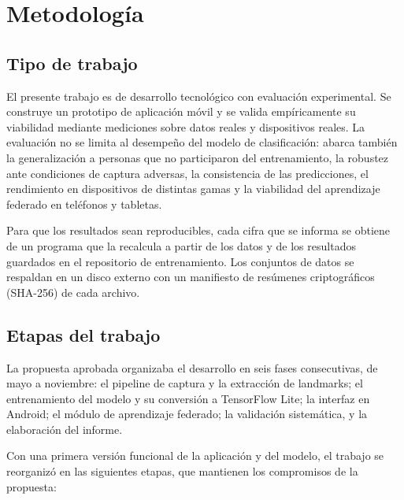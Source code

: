 \chapter{Metodología}
\label{cap:metodologia}

\section{Tipo de trabajo}

El presente trabajo es de desarrollo tecnológico con evaluación experimental. Se construye un prototipo de aplicación móvil y se valida empíricamente su viabilidad mediante mediciones sobre datos reales y dispositivos reales. La evaluación no se limita al desempeño del modelo de clasificación: abarca también la generalización a personas que no participaron del entrenamiento, la robustez ante condiciones de captura adversas, la consistencia de las predicciones, el rendimiento en dispositivos de distintas gamas y la viabilidad del aprendizaje federado en teléfonos y tabletas.

Para que los resultados sean reproducibles, cada cifra que se informa se obtiene de un programa que la recalcula a partir de los datos y de los resultados guardados en el repositorio de entrenamiento. Los conjuntos de datos se respaldan en un disco externo con un manifiesto de resúmenes criptográficos (SHA-256) de cada archivo.

\section{Etapas del trabajo}

La propuesta aprobada organizaba el desarrollo en seis fases consecutivas, de mayo a noviembre: el pipeline de captura y la extracción de landmarks; el entrenamiento del modelo y su conversión a TensorFlow Lite; la interfaz en Android; el módulo de aprendizaje federado; la validación sistemática, y la elaboración del informe.


Con una primera versión funcional de la aplicación y del modelo, el trabajo se reorganizó en las siguientes etapas, que mantienen los compromisos de la propuesta:

